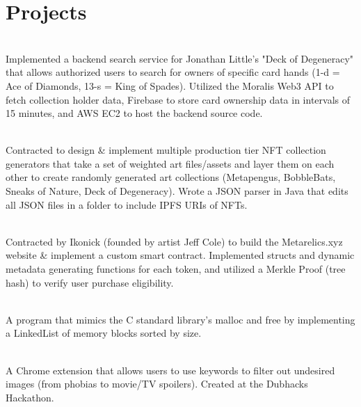 \documentclass[]{resume-openfont}
\newcommand{\courseWork}[1]{\textbf{Coursework:} #1}
\begin{document}
\sectionsep
\section{Projects}
\\
Implemented a backend search service for Jonathan Little's "Deck of Degeneracy" that allows authorized users to search for owners of specific card hands (1-d = Ace of Diamonds, 13-s = King of Spades). Utilized the Moralis Web3 API to fetch collection holder data, Firebase to store card ownership data in intervals of 15 minutes, and AWS EC2 to host the backend source code.

\\
Contracted to design \& implement multiple production tier NFT collection generators that take a set of weighted art files/assets and layer them on each other to create randomly generated art collections (Metapengus, BobbleBats, Sneaks of Nature, Deck of Degeneracy). Wrote a JSON parser in Java that edits all JSON files in a folder to include IPFS URIs of NFTs.
\sectionsep

\\
Contracted by Ikonick (founded by artist Jeff Cole) to build the Metarelics.xyz website \& implement a custom smart contract. Implemented structs and dynamic metadata generating functions for each token, and utilized a Merkle Proof (tree hash) to verify user purchase eligibility. 
\sectionsep

\\
A program that mimics the C standard library's malloc and free by implementing a LinkedList of memory blocks sorted by size.
\sectionsep

\\
A Chrome extension that allows users to use keywords to filter out undesired images (from phobias to movie/TV spoilers). Created at the Dubhacks Hackathon.
\sectionsep

\end{document}
